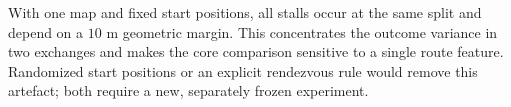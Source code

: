 
With one map and fixed start positions, all stalls occur at the same split and depend on a $10$ m geometric margin. This concentrates the outcome variance in two exchanges and makes the core comparison sensitive to a single route feature. Randomized start positions or an explicit rendezvous rule would remove this artefact; both require a new, separately frozen experiment.
